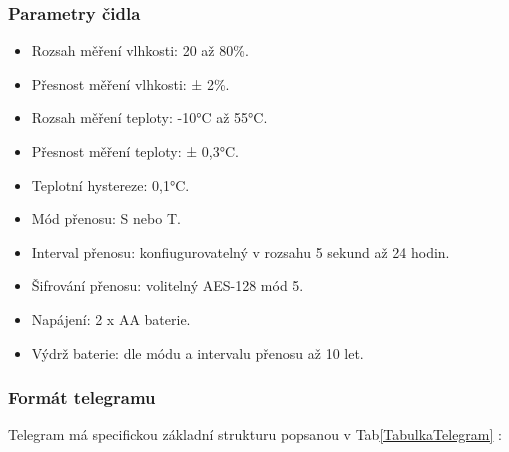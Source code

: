 \subsubsection{Parametry čidla}
\begin{itemize}
	\item Rozsah měření vlhkosti: 20 až 80\%.
	\item Přesnost měření vlhkosti: ± 2\%.
	\item Rozsah měření teploty: -10°C až 55°C.
	\item Přesnost měření teploty: ± 0,3°C.
	\item Teplotní hystereze: 0,1°C.
	\item Mód přenosu: S nebo T.
	\item Interval přenosu: konfiugurovatelný v rozsahu 5 sekund až 24 hodin.
	\item Šifrování přenosu: volitelný AES-128 mód 5.
	\item Napájení: 2 x AA baterie.
	\item Výdrž baterie: dle módu a intervalu přenosu až 10 let.
\end{itemize}


\subsubsection{Formát telegramu}

Telegram má specifickou základní strukturu popsanou v Tab\ref{TabulkaTelegram} \cite{WeptechCidlo}:

